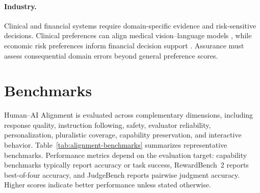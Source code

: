 \documentclass[11pt]{article}
\begin{document}
\paragraph{Industry.}
Clinical and financial systems require domain-specific evidence and risk-sensitive decisions. Clinical preferences can align medical vision--language models \citep{zhu2025mmedpo}, while economic risk preferences inform financial decision support \citep{liu2025economicrisk}. Assurance must assess consequential domain errors beyond general preference scores.

\section{Benchmarks}
\label{sec:benchmarks}

Human--AI Alignment is evaluated across complementary dimensions, including response quality, instruction following, safety, evaluator reliability, personalization, pluralistic coverage, capability preservation, and interactive behavior. Table~\ref{tab:alignment-benchmarks} summarizes representative benchmarks. Performance metrics depend on the evaluation target: capability benchmarks typically report accuracy or task success, RewardBench~2 reports best-of-four accuracy, and JudgeBench reports pairwise judgment accuracy. Higher scores indicate better performance unless stated otherwise.
\end{document}
